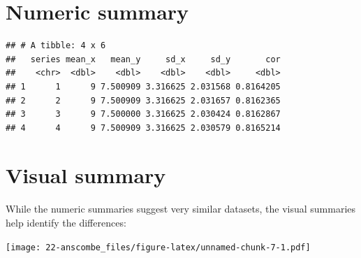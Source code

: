 \documentclass[]{book}
\newenvironment{Shaded}{\begin{snugshade}}{\end{snugshade}}
\newcommand{\KeywordTok}[1]{\textcolor[rgb]{0.13,0.29,0.53}{\textbf{{#1}}}}
\newcommand{\DataTypeTok}[1]{\textcolor[rgb]{0.13,0.29,0.53}{{#1}}}
\newcommand{\StringTok}[1]{\textcolor[rgb]{0.31,0.60,0.02}{{#1}}}
\newcommand{\NormalTok}[1]{{#1}}
\theoremstyle{definition}
\theoremstyle{definition}
\theoremstyle{remark}
\begin{document}
\section*{Numeric summary}\label{numeric-summary}

\begin{Shaded}
\end{Shaded}

\begin{verbatim}
## # A tibble: 4 x 6
##   series mean_x   mean_y     sd_x     sd_y       cor
##    <chr>  <dbl>    <dbl>    <dbl>    <dbl>     <dbl>
## 1      1      9 7.500909 3.316625 2.031568 0.8164205
## 2      2      9 7.500909 3.316625 2.031657 0.8162365
## 3      3      9 7.500000 3.316625 2.030424 0.8162867
## 4      4      9 7.500909 3.316625 2.030579 0.8165214
\end{verbatim}

\section*{Visual summary}\label{visual-summary}

While the numeric summaries suggest very similar datasets, the visual
summaries help identify the differences:

\begin{Shaded}
\end{Shaded}

\texttt{[image: 22-anscombe\_files/figure-latex/unnamed-chunk-7-1.pdf]}
\end{document}
